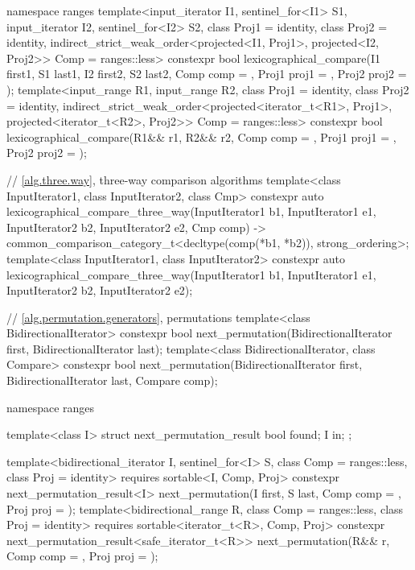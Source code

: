 \begin{codeblock}
{  namespace ranges {
    template<input_iterator I1, sentinel_for<I1> S1, input_iterator I2, sentinel_for<I2> S2,
             class Proj1 = identity, class Proj2 = identity,
             indirect_strict_weak_order<projected<I1, Proj1>, projected<I2, Proj2>> Comp =
               ranges::less>
      constexpr bool
        lexicographical_compare(I1 first1, S1 last1, I2 first2, S2 last2,
                                Comp comp = {}, Proj1 proj1 = {}, Proj2 proj2 = {});
    template<input_range R1, input_range R2, class Proj1 = identity,
             class Proj2 = identity,
             indirect_strict_weak_order<projected<iterator_t<R1>, Proj1>,
                                        projected<iterator_t<R2>, Proj2>> Comp = ranges::less>
      constexpr bool
        lexicographical_compare(R1&& r1, R2&& r2, Comp comp = {},
                                Proj1 proj1 = {}, Proj2 proj2 = {});
  }

  // \ref{alg.three.way}, three-way comparison algorithms
  template<class InputIterator1, class InputIterator2, class Cmp>
    constexpr auto
      lexicographical_compare_three_way(InputIterator1 b1, InputIterator1 e1,
                                        InputIterator2 b2, InputIterator2 e2,
                                        Cmp comp)
        -> common_comparison_category_t<decltype(comp(*b1, *b2)), strong_ordering>;
  template<class InputIterator1, class InputIterator2>
    constexpr auto
      lexicographical_compare_three_way(InputIterator1 b1, InputIterator1 e1,
                                        InputIterator2 b2, InputIterator2 e2);

  // \ref{alg.permutation.generators}, permutations
  template<class BidirectionalIterator>
    constexpr bool next_permutation(BidirectionalIterator first,
                                    BidirectionalIterator last);
  template<class BidirectionalIterator, class Compare>
    constexpr bool next_permutation(BidirectionalIterator first,
                                    BidirectionalIterator last, Compare comp);

  namespace ranges {
    template<class I>
    struct next_permutation_result {
      bool found;
      I in;
    };

    template<bidirectional_iterator I, sentinel_for<I> S, class Comp = ranges::less,
             class Proj = identity>
      requires sortable<I, Comp, Proj>
      constexpr next_permutation_result<I>
        next_permutation(I first, S last, Comp comp = {}, Proj proj = {});
    template<bidirectional_range R, class Comp = ranges::less,
             class Proj = identity>
      requires sortable<iterator_t<R>, Comp, Proj>
      constexpr next_permutation_result<safe_iterator_t<R>>
        next_permutation(R&& r, Comp comp = {}, Proj proj = {});
  }

}
\end{codeblock}
